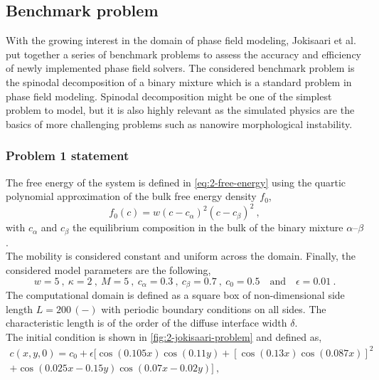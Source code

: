 \subsection{Benchmark problem}
    With the growing interest in the domain of phase field modeling, Jokisaari et al.\ \cite{JokisaariVoorheesGuyerWarrenHeinonen2017} put together a series of benchmark problems to assess the accuracy and efficiency of newly implemented phase field solvers. The considered benchmark problem is the spinodal decomposition of a binary mixture which is a standard problem in phase field modeling. Spinodal decomposition might be one of the simplest problem to model, but it is also highly relevant as the simulated physics are the basics of more challenging problems such as nanowire morphological instability.
    \subsubsection{Problem 1 statement}
    The free energy of the system is defined in \autoref{eq:2-free-energy} using the quartic polynomial approximation of the bulk free energy density $f_0$,
    \begin{equation}
        f_0(c) = w (c-c_{\alpha})^2 (c-c_{\beta})^2\ ,
    \end{equation}
    with $c_{\alpha}$ and $c_{\beta}$ the equilibrium composition in the bulk of the binary mixture $\alpha$--$\beta$.\\
    The mobility is considered constant and uniform across the domain.
    Finally, the considered model parameters are the following,
    \begin{equation}
        w = 5 \ , \ \kappa = 2 \  , \  M = 5 \  , \  c_{\alpha} = 0.3 \  , \  c_{\beta} = 0.7 \  , \  c_0 = 0.5 \quad \text{and} \quad \epsilon = 0.01 \ .
    \end{equation}
    The computational domain is defined as a square box of non-dimensional side length $L=200\,(-)$ with periodic boundary conditions on all sides. The characteristic length is of the order of the diffuse interface width $\delta$.\\
    The initial condition is shown in \autoref{fig:2-jokisaari-problem} and defined as,
    \begin{equation}
        \begin{aligned}
            c(x, y, 0) = c_0 + \epsilon [\cos{(0.105x)}\cos{(0.11y)}+\left[\cos{(0.13x)}\cos{(0.087x)}\right]^2\\
            +\cos{(0.025x-0.15y)}\cos{(0.07x-0.02y)}]\ ,
        \end{aligned}
    \end{equation}
